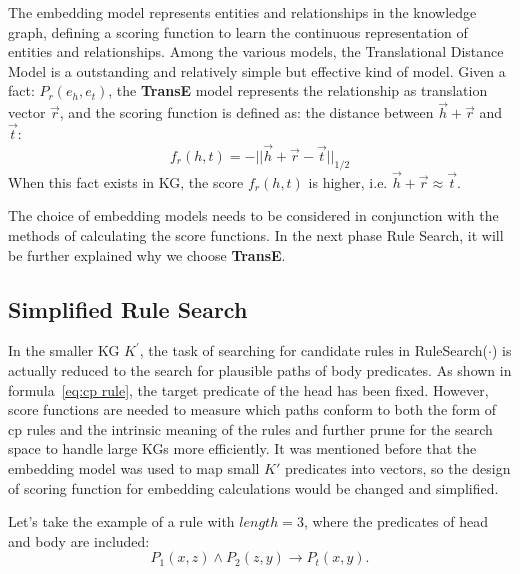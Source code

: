 \documentclass{article}
\begin{document}
	The embedding model represents entities and relationships in the knowledge graph, defining a scoring function to learn the continuous representation of entities and relationships. Among the various models, the Translational Distance Model is a outstanding and relatively simple but effective kind of model.
	Given a fact: $P_r(e_h,e_t)$, the {\bf TransE} model represents the relationship as translation vector $\vec{r}$, and the scoring function is defined as: the distance between $\vec{h}+\vec{r}$ and $\vec{t}$: 
	\begin{equation}
	f_r(h, t) = -||\vec{h}+\vec{r} -\vec{t}||_{1/2}
	\label{eq:transe}
	\end{equation}
	When this fact exists in KG, the score $f_r(h,t)$ is higher, i.e. $\vec{h}+\vec{r} \approx \vec{t}$.
	
	The choice of embedding models needs to be considered in conjunction with the methods of calculating the score functions. In the next phase Rule Search, it will be further explained why we choose {\bf TransE}.
	
	\subsection{Simplified Rule Search}
	In the smaller KG $K^{'}$, the task of searching for candidate rules in \textsf{RuleSearch($\cdot$)} is actually
reduced to the search for plausible paths of body predicates. As shown in formula~\ref{eq:cp rule}, the target predicate of the head has been fixed. However, score functions are needed to measure which paths conform to both the form of cp rules and the intrinsic meaning of the rules and further prune for the search space to handle large KGs more efficiently. It was mentioned before that the embedding model was used to map small $K'$ predicates into vectors, so the design of scoring function for embedding calculations would be changed and simplified. 
	
	Let's take the example of a rule with $length=3$, where the predicates of head and body are included:
	\begin{equation}
	P_1(x, z) \wedge P_2(z, y)  \to P_t(x, y). \nonumber
	\end{equation}
	
\end{document}
